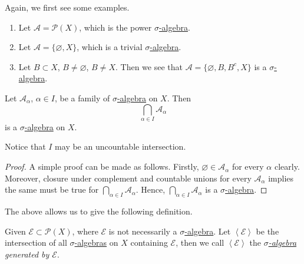 \begin{eg}
	Again, we first see some examples.
	\begin{enumerate}
		\item Let \(\mathcal{A} = \mathcal{P} (X)\), which is the power \hyperref[def:sigma-algebra]{\(\sigma\)-algebra}.
		\item Let \(\mathcal{A} = \{\varnothing , X\}\), which is a trivial \hyperref[def:sigma-algebra]{\(\sigma\)-algebra}.
		\item Let \(B\subset X\), \(B\neq \varnothing \), \(B\neq X\). Then we see that \(\mathcal{A} = \{\varnothing , B, B^{c}, X\}\) is a \hyperref[def:sigma-algebra]{\(\sigma\)-algebra}.
	\end{enumerate}
\end{eg}

\begin{lemma}
	Let \(\mathcal{A}_{\alpha}\), \(\alpha\in I\), be a family of \hyperref[def:sigma-algebra]{\(\sigma\)-algebra} on \(X\). Then
	\[
		\bigcap\limits_{\alpha\in I} \mathcal{A}_{\alpha}
	\]
	is a \hyperref[def:sigma-algebra]{\(\sigma\)-algebra} on \(X\).
\end{lemma}
\begin{remark}
	Notice that \(I\) may be an uncountable intersection.
\end{remark}
\begin{proof}
	A simple proof can be made as follows. Firstly, \(\varnothing \in \mathcal{A}_{\alpha}\) for every \(\alpha\) clearly.
	Moreover, closure under complement and countable unions for every \(\mathcal{A}_{\alpha}\) implies the same must be true for \(\bigcap\limits_{\alpha\in I} \mathcal{A}_{\alpha}\).
	Hence, \(\bigcap\limits_{\alpha\in I} \mathcal{A}_{\alpha}\) is a \hyperref[def:sigma-algebra]{\(\sigma\)-algebra}.
\end{proof}

The above allows us to give the following definition.
\begin{definition}\label{def:generation-of-sigma-algebra}
	Given \(\mathcal{E} \subset \mathcal{P} (X) \), where \(\mathcal{E}\) is not necessarily a \hyperref[def:sigma-algebra]{\(\sigma\)-algebra}. Let
	\(\left<\mathcal{E}\right>\) be the intersection of all \hyperref[def:sigma-algebra]{\(\sigma\)-algebras} on \(X\) containing \(\mathcal{E}\), then
	we call \(\left<\mathcal{E} \right>\) the \emph{\hyperref[def:sigma-algebra]{\(\sigma\)-algebra} generated by \(\mathcal{E}\)}.
\end{definition}

